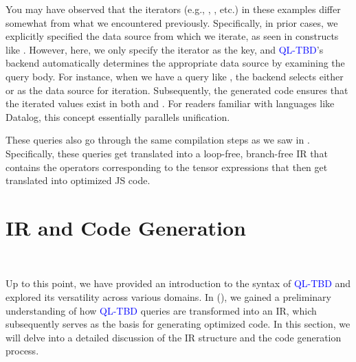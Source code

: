 \documentclass[runningheads]{llncs}
\newcommand{\lang}{\textcolor{blue}{QL-TBD}}
\begin{document}
You may have observed that the iterators (e.g., \inline{*}, , etc.) in these
examples differ somewhat from what we encountered previously.
Specifically, in prior cases, we explicitly specified the data source from which we iterate,
as seen in constructs like .
However, here, we only specify the iterator as the key, and \lang{}'s backend
automatically determines the appropriate data source by examining the query body.
For instance, when we have a query like , the
backend selects either  or  as the data source for iteration.
Subsequently, the generated code ensures that the iterated values exist in
both  and .
For readers familiar with languages like Datalog, this concept essentially
parallels unification.


These queries also go through the same compilation steps as we saw in .
Specifically, these queries get translated into a loop-free, branch-free IR that contains the
operators corresponding to the tensor expressions that then get translated into
optimized JS code.

\section{IR and Code Generation}~\label{sec:ir_codegen}

Up to this point, we have provided an introduction to the syntax of
\lang{} and explored its versatility across various domains.
In  (), we gained a preliminary understanding
of how \lang{} queries are transformed into an IR, which subsequently serves
as the basis for generating optimized code.
In this section, we will delve into a detailed discussion of the IR structure
and the code generation process.
\end{document}
